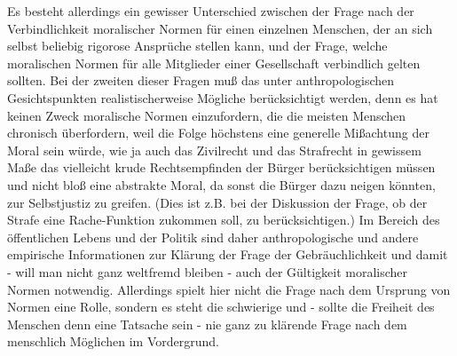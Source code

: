 \documentclass[12pt,a4paper]{article}
\begin{document}
Es besteht allerdings ein gewisser Unterschied zwischen der Frage nach der
Verbindlichkeit moralischer Normen für einen einzelnen Menschen, der an sich
selbst beliebig rigorose Ansprüche stellen kann, und der Frage, welche
moralischen Normen für alle Mitglieder einer Gesellschaft verbindlich gelten
sollten. Bei der zweiten dieser Fragen muß das unter anthropologischen
Gesichtspunkten realistischerweise Mögliche berücksichtigt werden, denn es hat
keinen Zweck moralische Normen einzufordern, die die meisten Menschen
chronisch überfordern, weil die Folge höchstens eine generelle Mißachtung der
Moral sein würde, wie ja auch das Zivilrecht und das Strafrecht in gewissem
Maße das vielleicht krude Rechtsempfinden der Bürger berücksichtigen müssen
und nicht bloß eine abstrakte Moral, da sonst die Bürger dazu neigen könnten,
zur Selbstjustiz zu greifen. (Dies ist z.B. bei der Diskussion der Frage, ob
der Strafe eine Rache-Funktion zukommen soll, zu berücksichtigen.) Im Bereich
des öffentlichen Lebens und der Politik sind daher anthropologische und andere
empirische Informationen zur Klärung der Frage der Gebräuchlichkeit und damit
- will man nicht ganz weltfremd bleiben - auch der Gültigkeit moralischer
Normen notwendig. Allerdings spielt hier nicht die Frage nach dem Ursprung
von Normen eine Rolle, sondern es steht die schwierige und - sollte die
Freiheit des Menschen denn eine Tatsache sein - nie ganz zu klärende Frage
nach dem menschlich Möglichen im Vordergrund.
\end{document}
